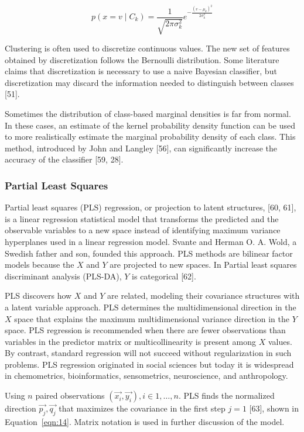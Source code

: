\documentclass[preprint,12pt]{elsarticle}
\begin{document}
\begin{equation}
	p(x=v\mid C_{k}) = \frac{1}{\sqrt{2\pi \sigma_{k}^{2}}} e^{-\frac{{(v-\mu_{k})}^{2}}{2\sigma_{k}^{2}}}
	\label{eqn:13}
\end{equation}

Clustering is often used to discretize continuous values. The new set of features obtained by discretization follows the Bernoulli distribution. Some literature claims that discretization is necessary to use a naive Bayesian classifier, but discretization may discard the information needed to distinguish between classes [51].

Sometimes the distribution of class-based marginal densities is far from normal. In these cases, an estimate of the kernel probability density function can be used to more realistically estimate the marginal probability density of each class. This method, introduced by John and Langley [56], can significantly increase the accuracy of the classifier [59, 28].

\subsubsection{Partial Least Squares}

Partial least squares (PLS) regression, or projection to latent structures, [60, 61], is a linear regression statistical model that transforms the predicted and the observable variables to a new space instead of identifying maximum variance hyperplanes used in a linear regression model. Svante and Herman O. A. Wold, a Swedish father and son, founded this approach. PLS methods are bilinear factor models because the $X$ and $Y$ are projected to new spaces. In Partial least squares discriminant analysis (PLS-DA), $Y$ is categorical [62].

PLS discovers how $X$ and $Y$ are related, modeling their covariance structures with a latent variable approach. PLS determines the multidimensional direction in the $X$ space that explains the maximum multidimensional variance direction in the $Y$ space. PLS regression is recommended when there are fewer observations than variables in the predictor matrix or multicollinearity is present among $X$ values. By contrast, standard regression will not succeed without regularization in such problems. PLS regression originated in social sciences but today it is widespread in chemometrics, bioinformatics, sensometrics, neuroscience, and anthropology.

Using $n$ paired observations $\left(\vec{x_{i}}, \vec{y_{i}}\right), i \in 1, \dots, n$. PLS finds the normalized direction $\vec{p_{j}}, \vec{q_{j}}$ that maximizes the covariance in the first step $j = 1$ [63], shown in Equation~\ref{eqn:14}. Matrix notation is used in further discussion of the model.
\end{document}
